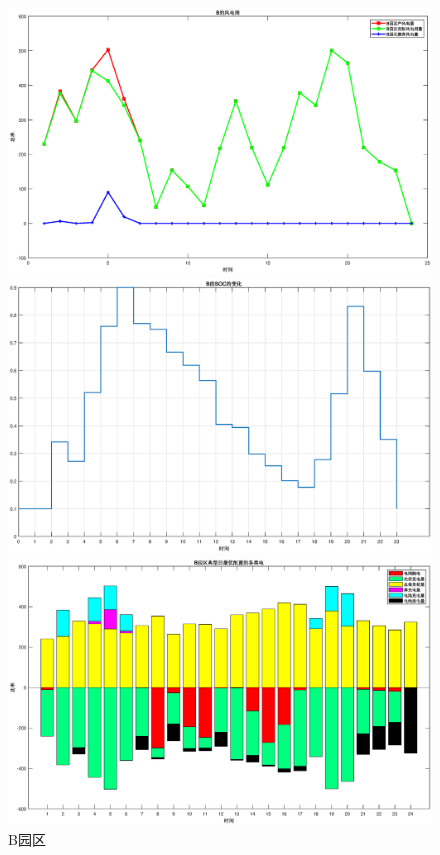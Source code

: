 \documentclass{cumcmthesis}
\begin{document}
  \begin{figure}[!h]  
\centering 
\begin{minipage}{.5\textwidth}  
  \centering  
  \includegraphics[width=.9\linewidth]{figures/Q1_3_B_wind.eps}  
\end{minipage}%
\begin{minipage}{.5\textwidth}  
  \centering  
  \includegraphics[width=.9\linewidth]{figures/Q1_3_B_SOC.eps}  
\end{minipage}  
\begin{minipage}{.5\textwidth}  
  \centering  
  \includegraphics[width=.9\linewidth]{figures/Q1_3_B_sort.eps}  
\end{minipage}  
\caption{B园区}  
\end{figure} 
\end{document}
